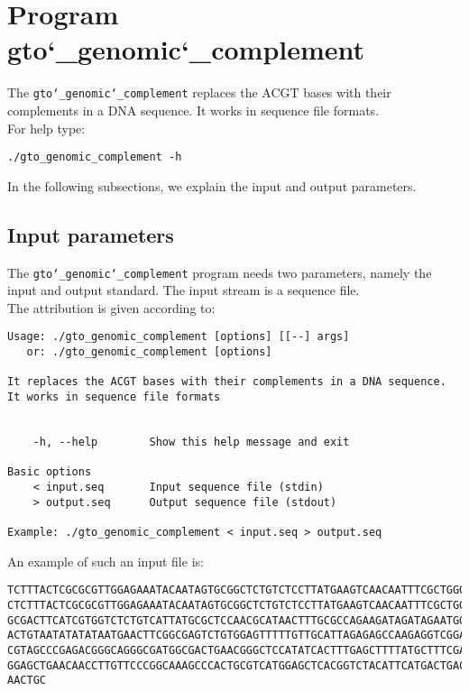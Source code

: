 \section{Program gto\char`_genomic\char`_complement}
The \texttt{gto\char`_genomic\char`_complement} replaces the ACGT bases with their complements in a DNA sequence. It works in sequence file formats.\\
For help type:
\begin{lstlisting}
./gto_genomic_complement -h
\end{lstlisting}
In the following subsections, we explain the input and output parameters.

\subsection*{Input parameters}

The \texttt{gto\char`_genomic\char`_complement}  program needs two parameters, namely the input and output standard. The input stream is a sequence file.\\
The attribution is given according to:
\begin{lstlisting}
Usage: ./gto_genomic_complement [options] [[--] args]
   or: ./gto_genomic_complement [options]

It replaces the ACGT bases with their complements in a DNA sequence.
It works in sequence file formats


    -h, --help        Show this help message and exit

Basic options
    < input.seq       Input sequence file (stdin)
    > output.seq      Output sequence file (stdout)

Example: ./gto_genomic_complement < input.seq > output.seq
\end{lstlisting}
An example of such an input file is:
\begin{lstlisting}
TCTTTACTCGCGCGTTGGAGAAATACAATAGTGCGGCTCTGTCTCCTTATGAAGTCAACAATTTCGCTGGGACTTGCGG
CTCTTTACTCGCGCGTTGGAGAAATACAATAGTGCGGCTCTGTCTCCTTATGAAGTCAACAATTTCGCTGGGACTTGCG
GCGACTTCATCGTGGTCTCTGTCATTATGCGCTCCAACGCATAACTTTGCGCCAGAAGATAGATAGAATGGTGTAAGAA
ACTGTAATATATATAATGAACTTCGGCGAGTCTGTGGAGTTTTTGTTGCATTAGAGAGCCAAGAGGTCGGACGTCCTCA
CGTAGCCCGAGACGGGCAGGGCGATGGCGACTGAACGGGCTCCATATCACTTTGAGCTTTTATGCTTTCGACTCCTCCA
GGAGCTGAACAACCTTGTTCCCGGCAAAGCCCACTGCGTCATGGAGCTCACGGTCTACATTCATGACTGACTAACCGTA
AACTGC
\end{lstlisting}

